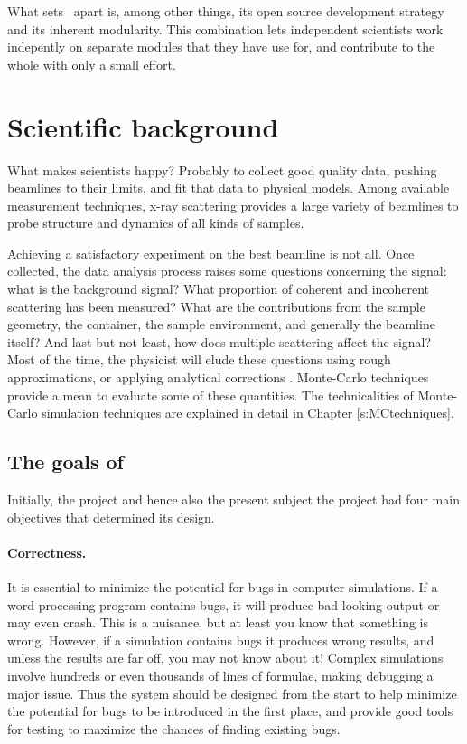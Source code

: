 What sets \MCX\ apart is, among other things, its open source
development strategy and its inherent modularity. 
This combination lets independent scientists work indepently on separate
modules that they have use for, and contribute to the whole with only a small
effort.

\section{Scientific background}
What makes scientists happy? Probably to collect good quality data, pushing beamlines to their limits, and fit that data to physical models.
Among available measurement techniques, x-ray scattering provides a
large variety of beamlines to probe structure and dynamics of all
kinds of samples.

Achieving a satisfactory experiment on the best beamline is not all. Once collected, the data analysis process
raises some questions concerning the signal: what is the background
signal? What proportion of coherent and incoherent scattering has
been measured? What are the contributions from the sample geometry, the
container, the sample environment, and generally the beamline
itself? And last but not least, how does multiple scattering affect the
signal? Most of the time, the physicist will elude these questions
using rough approximations, or applying analytical corrections
\cite{Copley86}. Monte-Carlo techniques provide a mean to evaluate
some of these quantities. The technicalities of Monte-Carlo simulation
techniques are explained in detail in Chapter \ref{s:MCtechniques}.


\subsection{The goals of \MCX}
\label{s:goals}

Initially, the \MCS project and hence also the present subject the \MCX project had four main objectives
that determined its design.

\paragraph{Correctness.}
It is essential to minimize the potential for bugs in computer
simulations.  If a word processing program contains bugs, it will
produce bad-looking output or may even crash. This is a nuisance, but at
least you know that something is wrong. However, if a simulation
contains bugs it produces wrong results, and unless the results are far
off, you may not know about it! Complex simulations involve hundreds or
even thousands of lines of formulae, making debugging a major issue. Thus the
system should be designed from the start to help minimize the potential
for bugs to be introduced in the first place, and provide good tools for
testing to maximize the chances of finding existing bugs.
%
